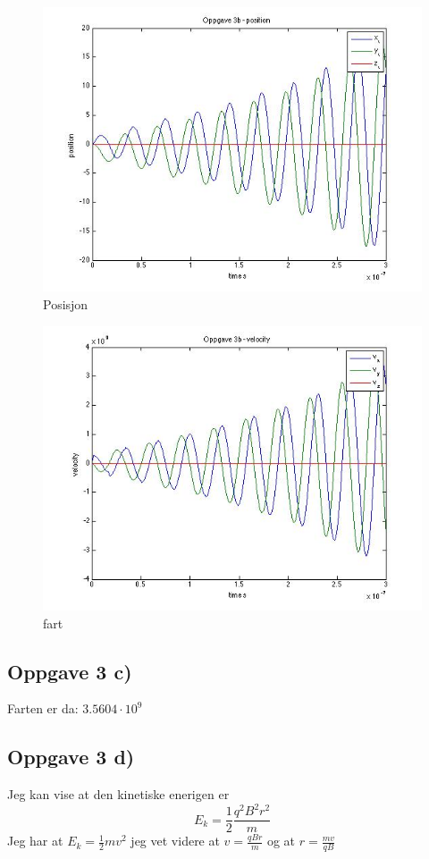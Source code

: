 \documentclass[12pt,a4paper,final,leqno]{report}
\begin{document}
\begin{figure}[H]
\caption{Posisjon}
\centering
\includegraphics[width=\textwidth]{oppgave3br.jpg}
\end{figure}

\begin{figure}[H]
\caption{fart}
\centering
\includegraphics[width=\textwidth]{oppgave3bv.jpg}
\end{figure}

\subsection*{Oppgave 3 c)}

Farten er da: $3.5604\cdot 10^9$
\newpage
\subsection*{Oppgave 3 d)}
Jeg kan vise at den kinetiske enerigen er
$$
E_k=\frac{1}{2}\frac{q^2B^2r^2}{m}
$$
Jeg har at $E_k=\frac{1}{2} mv^2$  jeg vet videre at $v=\frac{qBr}{m}$  og at $r=\frac{mv}{qB}$ 
\end{document}
